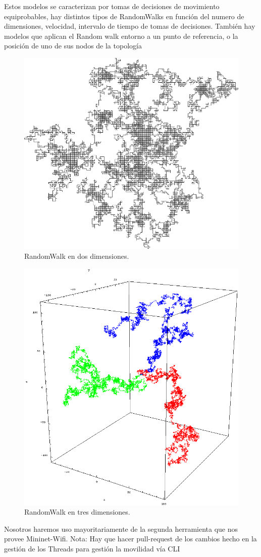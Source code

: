 Estos modelos se caracterizan por tomas de decisiones de movimiento equiprobables, hay distintos tipos de RandomWalks en función del numero de dimensiones, velocidad, intervalo de tiempo de tomas de decisiones. También hay modelos que aplican el Random walk entorno a un punto de referencia, o la posición de uno de sus nodos de la topología
\begin{figure}[!htb]
  \centering
    \includegraphics[width=\linewidth]{./img/movi/2.png}
    \caption{RandomWalk en dos dimensiones.}
  \label{fig:yo}
\end{figure}
\newpage
\begin{figure}[!htb]
  \centering
    \includegraphics[width=0.9\linewidth]{./img/movi/3.png}
    \caption{RandomWalk en tres dimensiones.}
  \label{fig:yo}
\end{figure}
Nosotros haremos uso mayoritariamente de la segunda herramienta que nos provee Mininet-Wifi. Nota: Hay que hacer pull-request de los cambios hecho en la gestión de los Threads para gestión la movilidad vía CLI
\newpage

